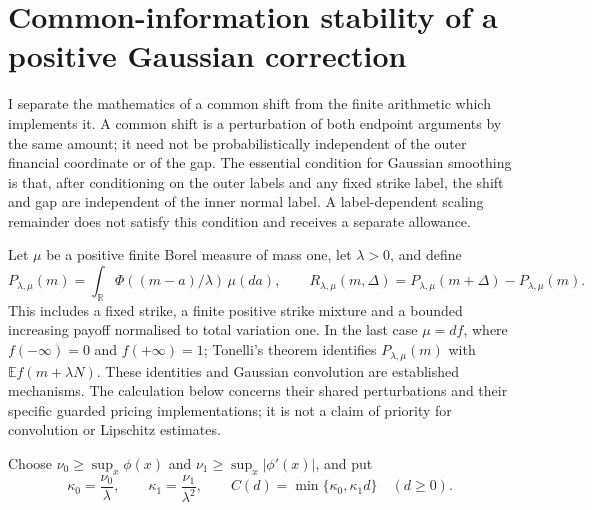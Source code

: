\documentclass[11pt]{article}
\begin{document}
\section{Common-information stability of a positive Gaussian correction}
\label{sec:common-information-stability}

I separate the mathematics of a common shift from the finite arithmetic
which implements it. A common shift is a perturbation of both endpoint
arguments by the same amount; it need not be probabilistically independent
of the outer financial coordinate or of the gap. The essential condition
for Gaussian smoothing is that, after conditioning on the outer labels
and any fixed strike label, the shift and gap are independent of the
inner normal label. A label-dependent scaling remainder does not satisfy
this condition and receives a separate allowance.

Let $\mu$ be a positive finite Borel measure of mass one, let $\lambda>0$,
and define
\begin{equation}
 P_{\lambda,\mu}(m)=\int_{\mathbb R}
       \Phi((m-a)/\lambda)\,\mu(da),\qquad
 R_{\lambda,\mu}(m,\Delta)=P_{\lambda,\mu}(m+\Delta)
                              -P_{\lambda,\mu}(m).
 \label{eq:common-information-definition}
\end{equation}
This includes a fixed strike, a finite positive strike mixture and a
bounded increasing payoff normalised to total variation one. In the last
case $\mu=df$, where $f(-\infty)=0$ and $f(+\infty)=1$; Tonelli's theorem
identifies $P_{\lambda,\mu}(m)$ with $\mathbb E f(m+\lambda N)$.
These identities and Gaussian convolution are established mechanisms.
The calculation below concerns their shared perturbations and their
specific guarded pricing implementations; it is not a claim of priority
for convolution or Lipschitz estimates.

Choose $\nu_0\geq\sup_x\phi(x)$ and
$\nu_1\geq\sup_x|\phi'(x)|$, and put
\begin{equation}
 \kappa_0=\frac{\nu_0}{\lambda},\qquad
 \kappa_1=\frac{\nu_1}{\lambda^2},\qquad
 C(d)=\min\{\kappa_0,\kappa_1d\}\quad(d\geq0).
 \label{eq:common-information-constants}
\end{equation}
\end{document}
